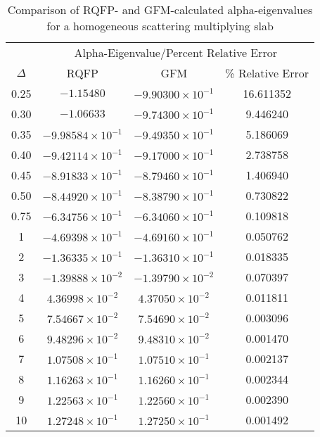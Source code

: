 \begin{table*}[!htbp]
\centering{}
\caption{Comparison of RQFP- and GFM-calculated alpha-eigenvalues for a homogeneous scattering multiplying slab}
\label{table:CompHomogMult}
\begin{tabular}{@{}cccc@{}}\toprule
& \multicolumn{3}{c}{Alpha-Eigenvalue/Percent Relative Error} \\
\cmidrule{2-4} $\Delta$ & RQFP & GFM & \% Relative Error \\
\midrule
0.25 & $-1.15480 $ & $-9.90300 \times 10^{-1}$ & 16.611352 \\ 
0.30 & $-1.06633 $ & $-9.74300 \times 10^{-1}$ & 9.446240 \\ 
0.35 & $-9.98584 \times 10^{-1}$ & $-9.49350 \times 10^{-1}$ & 5.186069 \\ 
0.40 & $-9.42114 \times 10^{-1}$ & $-9.17000 \times 10^{-1}$ & 2.738758 \\ 
0.45 & $-8.91833 \times 10^{-1}$ & $-8.79460 \times 10^{-1}$ & 1.406940 \\ 
0.50 & $-8.44920 \times 10^{-1}$ & $-8.38790 \times 10^{-1}$ & 0.730822 \\ 
0.75 & $-6.34756 \times 10^{-1}$ & $-6.34060 \times 10^{-1}$ & 0.109818 \\ 
1 & $-4.69398 \times 10^{-1}$ & $-4.69160 \times 10^{-1}$ & 0.050762 \\ 
2 & $-1.36335 \times 10^{-1}$ & $-1.36310 \times 10^{-1}$ & 0.018335 \\ 
3 & $-1.39888 \times 10^{-2}$ & $-1.39790 \times 10^{-2}$ & 0.070397 \\ 
4 & $4.36998 \times 10^{-2}$ & $4.37050 \times 10^{-2}$ & 0.011811 \\ 
5 & $7.54667 \times 10^{-2}$ & $7.54690 \times 10^{-2}$ & 0.003096 \\ 
6 & $9.48296 \times 10^{-2}$ & $9.48310 \times 10^{-2}$ & 0.001470 \\ 
7 & $1.07508 \times 10^{-1}$ & $1.07510 \times 10^{-1}$ & 0.002137 \\ 
8 & $1.16263 \times 10^{-1}$ & $1.16260 \times 10^{-1}$ & 0.002344 \\ 
9 & $1.22563 \times 10^{-1}$ & $1.22560 \times 10^{-1}$ & 0.002390 \\ 
10 & $1.27248 \times 10^{-1}$ & $1.27250 \times 10^{-1}$ & 0.001492 \\ 

\end{tabular}
\end{table*}
